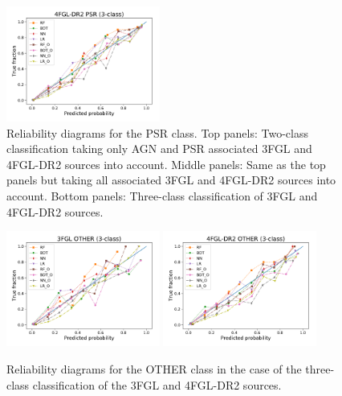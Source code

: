\documentclass[referee]{aa} %
\begin{document}
\begin{appendix}
\begin{figure}[h!t]
\includegraphics[width=0.45\textwidth]{plots/reliability/calibration_PSR_4FGL-DR2_3classes.pdf}
\caption{Reliability diagrams for the PSR class. Top panels: Two-class classification 
taking only AGN and PSR associated 3FGL and 4FGL-DR2 sources into account.
Middle panels: Same as the top panels but taking all associated 3FGL and 4FGL-DR2 sources  into account.
Bottom panels: Three-class classification of 3FGL and 4FGL-DR2 sources.
}
\label{fig:rel_PSR}
\end{figure}


\begin{figure}[ht]
\centering
\includegraphics[width=0.45\textwidth]{plots/reliability/calibration_OTHER_3FGL_3classes.pdf}
\includegraphics[width=0.45\textwidth]{plots/reliability/calibration_OTHER_4FGL-DR2_3classes.pdf}
\caption{Reliability diagrams for the OTHER class in the case of the three-class classification of the 3FGL and 4FGL-DR2 sources.
}
\label{fig:rel_OTHER}
\end{figure}


\end{appendix}
\end{document}
